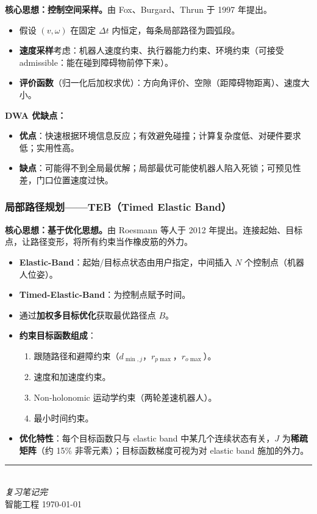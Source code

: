 \documentclass[11pt,a4paper]{article}
\begin{document}
\begin{keypoint}
\textbf{核心思想：控制空间采样。}由 Fox、Burgard、Thrun 于 1997 年提出。
\end{keypoint}

\begin{itemize}
  \item 假设 $(v,\omega)$ 在固定 $\Delta t$ 内恒定，每条局部路径为圆弧段。
  \item \textbf{速度采样}考虑：机器人速度约束、执行器能力约束、环境约束（可接受 admissible：能在碰到障碍物前停下来）。
  \item \textbf{评价函数}（归一化后加权求优）：方向角评价、空隙（距障碍物距离）、速度大小。
\end{itemize}

\begin{notebox}
\textbf{DWA 优缺点：}
\begin{itemize}
  \item \textbf{优点}：快速根据环境信息反应；有效避免碰撞；计算复杂度低、对硬件要求低；实用性高。
  \item \textbf{缺点}：可能得不到全局最优解；局部最优可能使机器人陷入死锁；可预见性差，门口位置速度过快。
\end{itemize}
\end{notebox}

\subsubsection*{局部路径规划——TEB（Timed Elastic Band）}

\begin{keypoint}
\textbf{核心思想：基于优化思想。}由 Roesmann 等人于 2012 年提出。连接起始、目标点，让路径变形，将所有约束当作橡皮筋的外力。
\end{keypoint}

\begin{itemize}
  \item \textbf{Elastic-Band}：起始/目标点状态由用户指定，中间插入 $N$ 个控制点（机器人位姿）。
  \item \textbf{Timed-Elastic-Band}：为控制点赋予时间。
  \item 通过\textbf{加权多目标优化}获取最优路径点 $B$。
  \item \textbf{约束目标函数组成}：
    \begin{enumerate}
      \item 跟随路径和避障约束（$d_{\min,j}$，$r_{p\max}$，$r_{o\max}$）。
      \item 速度和加速度约束。
      \item Non-holonomic 运动学约束（两轮差速机器人）。
      \item 最小时间约束。
    \end{enumerate}
  \item \textbf{优化特性}：每个目标函数只与 elastic band 中某几个连续状态有关，$J$ 为\textbf{稀疏矩阵}（约 15\% 非零元素）；目标函数梯度可视为对 elastic band 施加的外力。
\end{itemize}

\vfill
\begin{center}
\rule{0.5\textwidth}{0.4pt}\\[0.3em]
\textit{复习笔记完}\\[0.2em]
\small 智能工程 \quad \today
\end{center}
\end{document}
